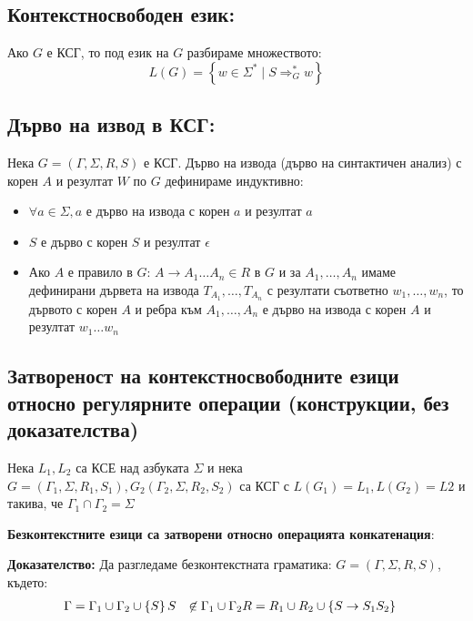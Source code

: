 \documentclass{article}
\renewcommand{\\}{\newline}
\newcommand{\sep}{\;|\;}
\newcommand{\doc}{\textbf{Доказателство: }}
\begin{document}
        \subsection{Контекстносвободен език: }      Ако \(G\) е КСГ, то под език на \(G\) разбираме множеството: \[
      L(G) = \left\{w \in \Sigma^{*} \sep S \Rightarrow_{G}^{*} w\right\}
    \]   

    \subsection{Дърво на извод в КСГ: }      Нека \(G = \left(\Gamma, \Sigma, R, S\right)\) е КСГ. Дърво на извода (дърво на синтактичен анализ) с корен \(A\) и резултат \(W\) по \(G\) дефинираме индуктивно: 
      \begin{itemize}
          \item \(\forall a \in \Sigma, a\) е дърво на извода с корен \(a\) и резултат \(a\) 
          \item \(S\) е дърво с корен \(S\) и резултат \(\epsilon\)
        \item Ако \(A\) е правило в \(G\): \(A \to A_1\dots A_n \in R\) в \(G\) и за \(A_{1},\dots,A_{n}\) имаме дефинирани дървета на извода \(T_{A_1},\dots,T_{A_n}\) с резултати съответно \(w_{1},\dots,w_{n}\), то дървото с корен \(A\) и ребра към \(A_{1}, \dots, A_{n}\) е дърво на извода с корен \(A\) и резултат \(w_1\dots w_n\)            
      \end{itemize}

      \subsection{Затвореност на контекстносвободните езици относно регулярните операции (конструкции, без доказателства) }
      Нека \(L_1, L_2\) са КСЕ над азбуката \(\Sigma\) и нека \(G = \left(\Gamma_1, \Sigma, R_1, S_1\right), G_2\left(\Gamma_2, \Sigma, R_2, S_2\right)\) са КСГ с \(L(G_1) = L_1, L(G_2) = L2\) и такива, че \(\Gamma_1 \cap \Gamma_2 = \Sigma\)     

      \textbf{Безконтекстните езици са затворени относно операцията конкатенация}:

      \doc Да разгледаме безконтекстната граматика: \(G = \left(\Gamma, \Sigma, R, S\right)\), където: \begin{align*}
        \Gamma &= \Gamma_1 \cup \Gamma_2 \cup \left\{S\right\} \\
        S &\not\in \Gamma_1 \cup \Gamma_2 \\
        R &= R_{1} \cup R_{2} \cup \left\{S \to S_1S_2\right\}
      \end{align*}
\end{document}
